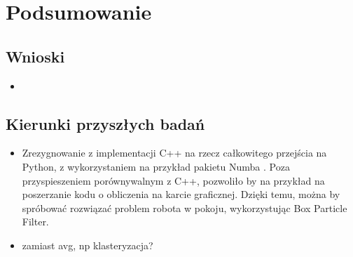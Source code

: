 \chapter{Podsumowanie}
\section{Wnioski}
\begin{itemize}
	\item 
\end{itemize}

\section{Kierunki przyszłych badań}
\begin{itemize}
	\item Zrezygnowanie z implementacji C++ na rzecz całkowitego przejścia na Python, z wykorzystaniem na przykład pakietu Numba \cite{numba}. Poza przyspieszeniem porównywalnym z C++, pozwoliło by na przykład na poszerzanie kodu o obliczenia na karcie graficznej. Dzięki temu, można by spróbować rozwiązać problem robota w pokoju, wykorzystując Box Particle Filter.
	\item zamiast avg, np klasteryzacja?
\end{itemize}